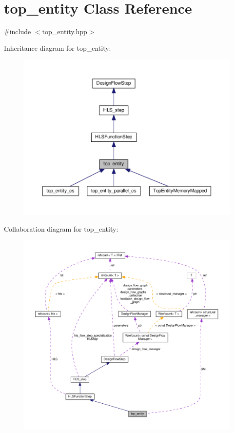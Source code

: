 \hypertarget{classtop__entity}{}\section{top\+\_\+entity Class Reference}
\label{classtop__entity}


{\ttfamily \#include $<$top\+\_\+entity.\+hpp$>$}



Inheritance diagram for top\+\_\+entity\+:
\nopagebreak
\begin{figure}[H]
\begin{center}
\leavevmode
\includegraphics[width=350pt]{d3/dec/classtop__entity__inherit__graph}
\end{center}
\end{figure}


Collaboration diagram for top\+\_\+entity\+:
\nopagebreak
\begin{figure}[H]
\begin{center}
\leavevmode
\includegraphics[width=350pt]{dd/d73/classtop__entity__coll__graph}
\end{center}
\end{figure}
